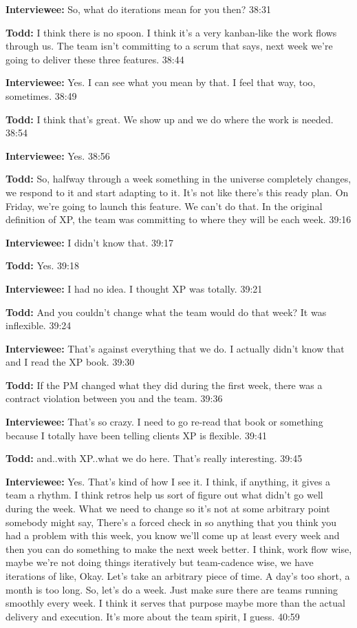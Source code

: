 \textbf{Interviewee:} So, what do iterations mean for you then? 38:31

\textbf{Todd:} I think there is no spoon. I think it's a very kanban-like the work flows through us. The team isn't committing to a scrum that says, next week we're going to deliver these three features. 38:44

\textbf{Interviewee:} Yes. I can see what you mean by that. I feel that way, too, sometimes. 38:49

\textbf{Todd:} I think that's great. We show up and we do where the work is needed. 38:54

\textbf{Interviewee:} Yes. 38:56

\textbf{Todd:} So, halfway through a week something in the universe completely changes, we respond to it and start adapting to it. It's not like there's this ready plan. On Friday, we're going to launch this feature. We can't do that. In the original definition of XP, the team was committing to where they will be each week. 39:16

\textbf{Interviewee:} I didn't know that. 39:17

\textbf{Todd:} Yes. 39:18

\textbf{Interviewee:} I had no idea. I thought XP was totally. 39:21

\textbf{Todd:} And you couldn't change what the team would do that week? It was inflexible. 39:24

\textbf{Interviewee:} That's against everything that we do. I actually didn't know that and I read the XP book. 39:30

\textbf{Todd:} If the PM changed what they did during the first week, there was a contract violation between you and the team. 39:36

\textbf{Interviewee:} That's so crazy. I need to go re-read that book or something because I totally have been telling clients XP is flexible. 39:41

\textbf{Todd:} and..with XP..what we do here. That's really interesting. 39:45

\textbf{Interviewee:} Yes. That's kind of how I see it. I think, if anything, it gives a team a rhythm. I think retros help us sort of figure out what didn't go well during the week. What we need to change so it's not at some arbitrary point somebody might say,  There's a forced check in so anything that you think you had a problem with this week, you know we'll come up at least every week and then you can do something to make the next week better. I think, work flow wise, maybe we're not doing things iteratively but team-cadence wise, we have iterations of like, Okay. Let's take an arbitrary piece of time. A day's too short, a month is too long. So, let's do a week. Just make sure there are teams running smoothly every week. I think it serves that purpose maybe more than the actual delivery and execution. It's more about the team spirit, I guess. 40:59

